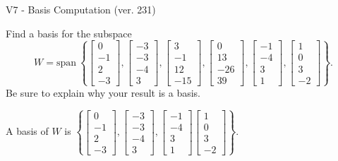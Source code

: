 \begin{exercise}
  \begin{exerciseTitle}V7 - Basis Computation (ver. 231)\end{exerciseTitle}
  \begin{exerciseStatement}
    Find a basis for the subspace 
\[W=\mathrm{span}\ \left\{\left[\begin{array}{r}
0 \\
-1 \\
2 \\
-3
\end{array}\right] , \left[\begin{array}{r}
-3 \\
-3 \\
-4 \\
3
\end{array}\right] , \left[\begin{array}{r}
3 \\
-1 \\
12 \\
-15
\end{array}\right] , \left[\begin{array}{r}
0 \\
13 \\
-26 \\
39
\end{array}\right] , \left[\begin{array}{r}
-1 \\
-4 \\
3 \\
1
\end{array}\right] , \left[\begin{array}{r}
1 \\
0 \\
3 \\
-2
\end{array}\right]\right\}.\]
 Be sure to explain why your result is a basis.


  \end{exerciseStatement}
  \begin{exerciseAnswer}
   A basis of \(W\) is  \(\left\{\left[\begin{array}{r}
0 \\
-1 \\
2 \\
-3
\end{array}\right] , \left[\begin{array}{r}
-3 \\
-3 \\
-4 \\
3
\end{array}\right] , \left[\begin{array}{r}
-1 \\
-4 \\
3 \\
1
\end{array}\right] \left[\begin{array}{r}
1 \\
0 \\
3 \\
-2
\end{array}\right]\right\}\).
  


  \end{exerciseAnswer}
\end{exercise}